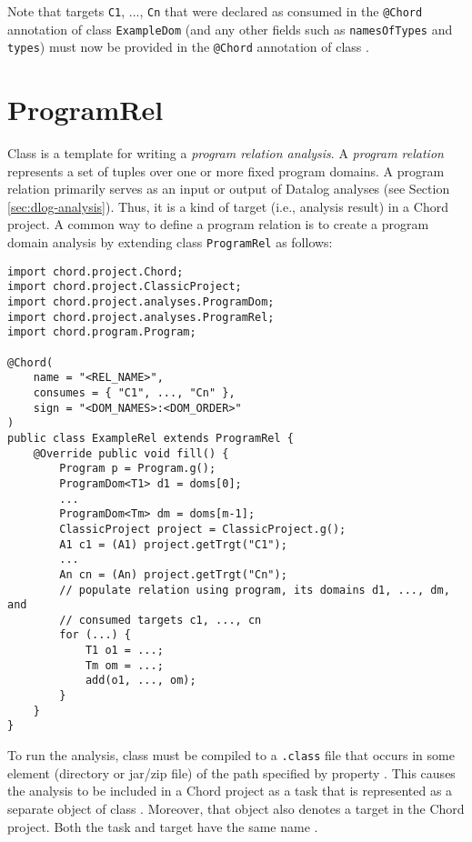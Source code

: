 Note that targets {\tt C1}, ..., {\tt Cn} that were declared as consumed in
the {\tt @Chord} annotation of class {\tt ExampleDom} (and any other fields
such as {\tt namesOfTypes} and {\tt types}) must now be provided in the
{\tt @Chord} annotation of class .

\section{ProgramRel}
\label{sec:program-rel}

Class 
is a template for writing a {\it program relation analysis}.
A {\it program relation} represents a set of tuples over one or more fixed 
program domains.  A program relation primarily serves as an input or output of
Datalog analyses (see Section \ref{sec:dlog-analysis}).  Thus, it is a kind of
target (i.e., analysis result) in a Chord project.  A common way to define a
program relation is to create a program domain analysis by extending class
{\tt ProgramRel} as follows:

\begin{framed}
\begin{verbatim}
import chord.project.Chord;
import chord.project.ClassicProject;
import chord.project.analyses.ProgramDom;
import chord.project.analyses.ProgramRel;
import chord.program.Program;

@Chord(
    name = "<REL_NAME>",
    consumes = { "C1", ..., "Cn" },
    sign = "<DOM_NAMES>:<DOM_ORDER>"
)
public class ExampleRel extends ProgramRel {
    @Override public void fill() {
        Program p = Program.g();
        ProgramDom<T1> d1 = doms[0];
        ...
        ProgramDom<Tm> dm = doms[m-1];
        ClassicProject project = ClassicProject.g();
        A1 c1 = (A1) project.getTrgt("C1");
        ...
        An cn = (An) project.getTrgt("Cn");
        // populate relation using program, its domains d1, ..., dm, and
        // consumed targets c1, ..., cn
        for (...) {
            T1 o1 = ...;
            Tm om = ...;
            add(o1, ..., om); 
        }
    }
}
\end{verbatim}
\end{framed}

To run the analysis, class  must be compiled to a {\tt .class}
file that occurs in some element (directory or jar/zip file) of the path
specified by property .  This causes the
analysis to be included in a Chord project as a task that is represented as a
separate object of class .  Moreover, that object also denotes
a target in the Chord project.  Both the task and target have the same name
.

